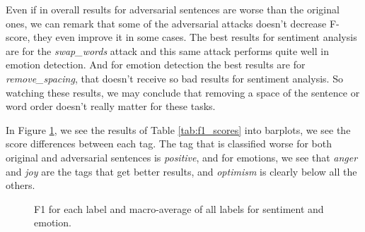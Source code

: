 \documentclass[11pt,a4paper]{article}
\begin{document}
Even if in overall results for adversarial sentences are worse than the original ones, we can remark that some of the adversarial attacks doesn't decrease F-score, they even improve it in some cases. The best results for sentiment analysis are for the \textit{swap\_words} attack and this same attack performs quite well in emotion detection. And for emotion detection the best results are for \textit{remove\_spacing}, that doesn't receive so bad results for sentiment analysis. So watching these results, we may conclude that removing a space of the sentence or word order doesn't really matter for these tasks.

In Figure \ref{fig:barplots}, we see the results of Table \ref{tab:f1_scores} into barplots, we see the score differences between each tag. The tag that is classified worse for both original and adversarial sentences is \textit{positive}, and for emotions, we see that \textit{anger} and \textit{joy} are the tags that get better results, and \textit{optimism} is clearly below all the others.

\begin{figure}[ht]
    \centering
    \caption{F1 for each label and macro-average of all labels for sentiment and emotion.}
    \label{fig:barplots}
\end{figure}
\end{document}
